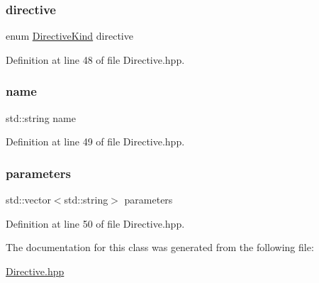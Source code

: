 \subsubsection{\texorpdfstring{directive}{directive}}
{\footnotesize\ttfamily enum \hyperlink{namespaceft_a5a5554dff10f0dc50bae4cc5825ad75d}{Directive\+Kind} directive}



Definition at line 48 of file Directive.\+hpp.

\mbox{\label{classft_1_1_directive_a9b45b3e13bd9167aab02e17e08916231}} 
\subsubsection{\texorpdfstring{name}{name}}
{\footnotesize\ttfamily std\+::string name}



Definition at line 49 of file Directive.\+hpp.

\mbox{\label{classft_1_1_directive_a2197fbfab6b0ae80e5599c8ddc562479}} 
\subsubsection{\texorpdfstring{parameters}{parameters}}
{\footnotesize\ttfamily std\+::vector$<$std\+::string$>$ parameters}



Definition at line 50 of file Directive.\+hpp.



The documentation for this class was generated from the following file\+:\begin{DoxyCompactItemize}
\item 
\hyperlink{_directive_8hpp}{Directive.\+hpp}\end{DoxyCompactItemize}
